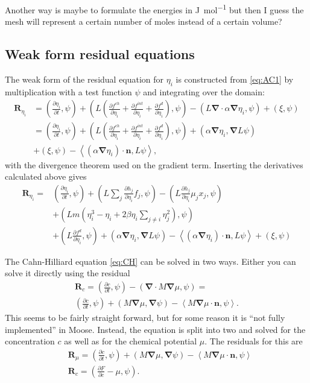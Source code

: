 \documentclass[12pt,a4paper]{article}
\newcommand{\partdiff}[2]{\frac{\partial#1}{\partial#2}}
\providecommand{\vbf}[1]{\boldsymbol{#1}}
\providecommand{\gradient}[0]{\vbf{\nabla}}
\providecommand{\vint}[2]{\left(#1,#2\right)}
\providecommand{\sint}[2]{\left<#1,#2\right>}
\begin{document}
Another way is maybe to formulate the energies in \si{\joule\per\mol} but then I guess the mesh will represent a certain number of moles instead of a certain volume? 
\subsection{Weak form residual equations}
The weak form of the residual equation for $\eta_i$ is constructed from \cref{eq:AC1} by multiplication with a test function $\psi$ and integrating over the domain:
\begin{equation}
\begin{aligned}
  \vbf{R}_{\eta_i}&=\vint{\partdiff{\eta_i}{t}}{\psi}+\vint{L\left(\partdiff{f^{ch}}{\eta_i}+\partdiff{f^{int}}{\eta_i}+\partdiff{f^d}{\eta_i}\right)}{\psi}-\vint{L\gradient\cdot\alpha\gradient\eta_i}{\psi}+\vint{\xi}{\psi} \\
  &=\vint{\partdiff{\eta_i}{t}}{\psi}+\vint{L\left(\partdiff{f^{ch}}{\eta_i}+\partdiff{f^{int}}{\eta_i}+\partdiff{f^d}{\eta_i}\right)}{\psi}+\vint{\alpha\gradient\eta_i}{\gradient L\psi}\\
  &+\vint{\xi}{\psi}-\sint{(\alpha\gradient\eta_i)\cdot\vbf{n}}{L\psi},
\end{aligned}
\end{equation}\todo{term with $\partdiff{f^d}{\gradient\eta_i}$ is missing}
with the divergence theorem used on the gradient term.
Inserting the derivatives calculated above gives
\begin{equation}
\begin{aligned}
  \vbf{R}_{\eta_i}=&\vint{\partdiff{\eta_i}{t}}{\psi}+\vint{L\sum_j\partdiff{h_j}{\eta_i}f_j}{\psi}-\vint{L\partdiff{h_j}{\eta_i}\mu_jx_j}{\psi}\\
  &+\vint{Lm\left(\eta_i^3-\eta_i+2\beta\eta_i\sum_{j\ne i}\eta_j^2\right)}{\psi} \\
  &+\vint{L\partdiff{f^d}{\eta_i}}{\psi}+\vint{\alpha\gradient\eta_i}{\gradient L\psi} -\sint{(\alpha\gradient\eta_i)\cdot\vbf{n}}{L\psi}+\vint{\xi}{\psi}
 \end{aligned}
\end{equation}


The Cahn-Hilliard equation \cref{eq:CH} can be solved in two ways.
Either you can solve it directly using the residual
\begin{multline}
  \vbf{R}_c=\vint{\partdiff{c}{t}}{\psi}-\vint{\gradient\cdot M\gradient\mu}{\psi}=\\ \vint{\partdiff{c}{t}}{\psi}+\vint{M\gradient\mu}{\gradient\psi}-\sint{M\gradient\mu\cdot\vbf{n}}{\psi}.
\end{multline}
This seems to be fairly straight forward, but for some reason it is ``not fully implemented'' in Moose.
Instead, the equation is split into two and solved for the concentration $c$ as well as for the chemical potential $\mu$.
The residuals for this are
\begin{align}
  &\vbf{R}_\mu=\vint{\partdiff{c}{t}}{\psi}+\vint{M\gradient\mu}{\gradient\psi}-\sint{M\gradient\mu\cdot\vbf{n}}{\psi} \\
  &\vbf{R}_c=\vint{\partdiff{F}{c}-\mu}{\psi}.
\end{align}
\end{document}
